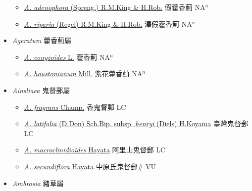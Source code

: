 \begin{itemize}
  \begin{itemize}
        \item[] \href{http://www.theplantlist.org/tpl1.1/search?q=Ageratina+adenophora}{\textit{A. adenophora} (Spreng.) R.M.King \& H.Rob.}   假藿香薊 NA$^n$
        \item[] \href{http://www.theplantlist.org/tpl1.1/search?q=Ageratina+riparia}{\textit{A. riparia} (Regel) R.M.King \& H.Rob.}   澤假藿香薊 NA$^n$
  \end{itemize}
 \item[] \textit{Ageratum} 藿香薊屬
                    
  \begin{itemize}
        \item[] \href{http://www.theplantlist.org/tpl1.1/search?q=Ageratum+conyzoides}{\textit{A. conyzoides} L.}   藿香薊 NA$^n$
        \item[] \href{http://www.theplantlist.org/tpl1.1/search?q=Ageratum+houstonianum}{\textit{A. houstonianum} Mill.}   紫花藿香薊 NA$^n$
  \end{itemize}
 \item[] \textit{Ainsliaea} 鬼督郵屬
                    
  \begin{itemize}
        \item[] \href{http://www.theplantlist.org/tpl1.1/search?q=Ainsliaea+fragrans}{\textit{A. fragrans} Champ.}   香鬼督郵 LC
        \item[] \href{http://www.theplantlist.org/tpl1.1/search?q=Ainsliaea+latifolia+subsp.+henryi}{\textit{A. latifolia} (D.Don) Sch.Bip. subsp. \textit{henryi} (Diels) H.Koyama}   臺灣鬼督郵 LC
        \item[] \href{http://www.theplantlist.org/tpl1.1/search?q=Ainsliaea+macroclinidioides}{\textit{A. macroclinidioides} Hayata}   阿里山鬼督郵 LC
        \item[] \href{http://www.theplantlist.org/tpl1.1/search?q=Ainsliaea+secundiflora}{\textit{A. secundiflora} Hayata}   中原氏鬼督郵\# VU
  \end{itemize}
 \item[] \textit{Ambrosia} 豬草屬
                    

\end{itemize}
